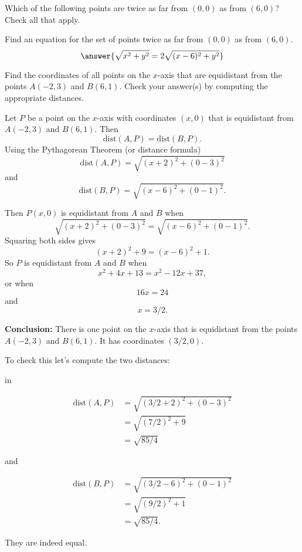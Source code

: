 \documentclass{ximera}
\newcommand{\pskip}{\vskip 0.1 in}
\begin{document}
\begin{exercise}  
  Which of the following points are twice as far from $(0,0)$ as from $(6,0)$? Check all that apply.  
  \begin{selectAll}  
     \end{selectAll}  
\end{exercise}  


\begin{question} 
Find an equation for the set of points twice as far from $(0,0)$ as from $(6,0)$. 
\[
  \answer{\sqrt{x^2+y^2} = 2 \sqrt{(x-6)^2+y^2}} 
\]
    \end{question}






\begin{example}
Find the coordinates of all points on the $x$-axis that are equidistant from the points $A(-2,3)$ and $B(6,1)$. Check your answer(s) by computing the appropriate distances.
\end{example}

\begin{explanation}
Let $P$ be a point on the $x$-axis with coordinates $(x,0)$ that is equidistant from $A(-2,3)$ and $B(6,1)$. Then
\[
    \text{dist}(A,P) = \text{dist}(B,P) .
\]
Using the Pythagorean Theorem (or distance formula)
\[
    \text{dist}(A,P) = \sqrt{(x+2)^2 + (0-3)^2}
\]
and
\[
    \text{dist}(B,P) = \sqrt{(x-6)^2 + (0-1)^2} .
\]

Then $P(x,0)$ is equidistant from $A$ and $B$ when
\[
  \sqrt{(x+2)^2 + (0-3)^2} = \sqrt{(x-6)^2 + (0-1)^2} .
\]
Squaring both sides gives
\[
   (x+2)^2 +9 = (x-6)^2 + 1 .
\]
So $P$ is equidistant from $A$ and $B$ when
\[
    x^2 + 4x + 13 = x^2 - 12x + 37, 
\]
or when
\[
     16x = 24
\]
and 
\[
   x=3/2 .
\]

{\bf Conclusion:} There is one point on the $x$-axis that is equidistant from the points $A(-2,3)$ and $B(6,1)$. It has coordinates $(3/2,0)$. 

To check this let's compute the two distances:

\pskip

\begin{align*}
    \text{dist}(A,P)  &= \sqrt{(3/2+2)^2 + (0-3)^2} \\
                             &= \sqrt{(7/2)^2 + 9} \\
                             &= \sqrt{85/4}
\end{align*}

and 

\begin{align*}
    \text{dist}(B,P)  &= \sqrt{(3/2-6)^2 + (0-1)^2} \\
                             &= \sqrt{(9/2)^2 + 1} \\
                             &= \sqrt{85/4} .
\end{align*}

They are indeed equal.


\end{explanation}
\end{document}
